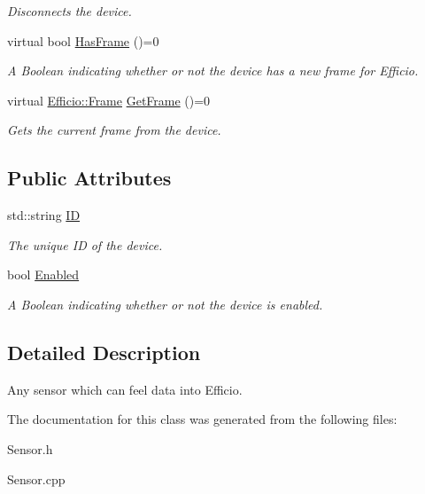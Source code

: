 \begin{DoxyCompactItemize}
\begin{DoxyCompactList}\small\item\em Disconnects the device. \end{DoxyCompactList}\item 
virtual bool \hyperlink{class_efficio_1_1_sensor_a579b48d76fa6db36f120cc496057643f}{Has\+Frame} ()=0\hypertarget{class_efficio_1_1_sensor_a579b48d76fa6db36f120cc496057643f}{}\label{class_efficio_1_1_sensor_a579b48d76fa6db36f120cc496057643f}

\begin{DoxyCompactList}\small\item\em A Boolean indicating whether or not the device has a new frame for Efficio. \end{DoxyCompactList}\item 
virtual \hyperlink{class_efficio_1_1_frame}{Efficio\+::\+Frame} \hyperlink{class_efficio_1_1_sensor_a83843b368a6d8bdcff29765640e15d90}{Get\+Frame} ()=0\hypertarget{class_efficio_1_1_sensor_a83843b368a6d8bdcff29765640e15d90}{}\label{class_efficio_1_1_sensor_a83843b368a6d8bdcff29765640e15d90}

\begin{DoxyCompactList}\small\item\em Gets the current frame from the device. \end{DoxyCompactList}\end{DoxyCompactItemize}
\subsection*{Public Attributes}
\begin{DoxyCompactItemize}
\item 
std\+::string \hyperlink{class_efficio_1_1_sensor_a1960849092c76a9ae6fad685712a6941}{ID}\hypertarget{class_efficio_1_1_sensor_a1960849092c76a9ae6fad685712a6941}{}\label{class_efficio_1_1_sensor_a1960849092c76a9ae6fad685712a6941}

\begin{DoxyCompactList}\small\item\em The unique ID of the device. \end{DoxyCompactList}\item 
bool \hyperlink{class_efficio_1_1_sensor_ad3cd2a20f3fd8b98d9325b0d85c1b589}{Enabled}\hypertarget{class_efficio_1_1_sensor_ad3cd2a20f3fd8b98d9325b0d85c1b589}{}\label{class_efficio_1_1_sensor_ad3cd2a20f3fd8b98d9325b0d85c1b589}

\begin{DoxyCompactList}\small\item\em A Boolean indicating whether or not the device is enabled. \end{DoxyCompactList}\end{DoxyCompactItemize}


\subsection{Detailed Description}
Any sensor which can feel data into Efficio. 

The documentation for this class was generated from the following files\+:\begin{DoxyCompactItemize}
\item 
Sensor.\+h\item 
Sensor.\+cpp\end{DoxyCompactItemize}

